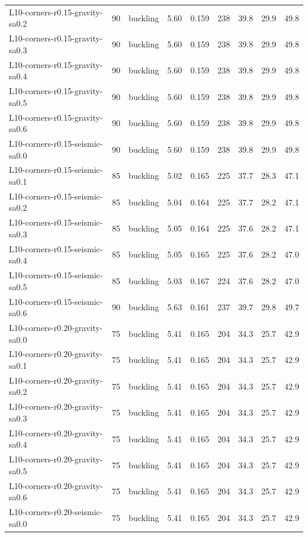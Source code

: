 \begin{longtable}{lrlrrrrrr}
L10-corners-r0.15-gravity-sa0.2 & 90 & buckling & 5.60 & 0.159 & 238 & 39.8 & 29.9 & 49.8 \\
L10-corners-r0.15-gravity-sa0.3 & 90 & buckling & 5.60 & 0.159 & 238 & 39.8 & 29.9 & 49.8 \\
L10-corners-r0.15-gravity-sa0.4 & 90 & buckling & 5.60 & 0.159 & 238 & 39.8 & 29.9 & 49.8 \\
L10-corners-r0.15-gravity-sa0.5 & 90 & buckling & 5.60 & 0.159 & 238 & 39.8 & 29.9 & 49.8 \\
L10-corners-r0.15-gravity-sa0.6 & 90 & buckling & 5.60 & 0.159 & 238 & 39.8 & 29.9 & 49.8 \\
L10-corners-r0.15-seismic-sa0.0 & 90 & buckling & 5.60 & 0.159 & 238 & 39.8 & 29.9 & 49.8 \\
L10-corners-r0.15-seismic-sa0.1 & 85 & buckling & 5.02 & 0.165 & 225 & 37.7 & 28.3 & 47.1 \\
L10-corners-r0.15-seismic-sa0.2 & 85 & buckling & 5.04 & 0.164 & 225 & 37.7 & 28.2 & 47.1 \\
L10-corners-r0.15-seismic-sa0.3 & 85 & buckling & 5.05 & 0.164 & 225 & 37.6 & 28.2 & 47.1 \\
L10-corners-r0.15-seismic-sa0.4 & 85 & buckling & 5.05 & 0.165 & 225 & 37.6 & 28.2 & 47.0 \\
L10-corners-r0.15-seismic-sa0.5 & 85 & buckling & 5.03 & 0.167 & 224 & 37.6 & 28.2 & 47.0 \\
L10-corners-r0.15-seismic-sa0.6 & 90 & buckling & 5.63 & 0.161 & 237 & 39.7 & 29.8 & 49.7 \\
L10-corners-r0.20-gravity-sa0.0 & 75 & buckling & 5.41 & 0.165 & 204 & 34.3 & 25.7 & 42.9 \\
L10-corners-r0.20-gravity-sa0.1 & 75 & buckling & 5.41 & 0.165 & 204 & 34.3 & 25.7 & 42.9 \\
L10-corners-r0.20-gravity-sa0.2 & 75 & buckling & 5.41 & 0.165 & 204 & 34.3 & 25.7 & 42.9 \\
L10-corners-r0.20-gravity-sa0.3 & 75 & buckling & 5.41 & 0.165 & 204 & 34.3 & 25.7 & 42.9 \\
L10-corners-r0.20-gravity-sa0.4 & 75 & buckling & 5.41 & 0.165 & 204 & 34.3 & 25.7 & 42.9 \\
L10-corners-r0.20-gravity-sa0.5 & 75 & buckling & 5.41 & 0.165 & 204 & 34.3 & 25.7 & 42.9 \\
L10-corners-r0.20-gravity-sa0.6 & 75 & buckling & 5.41 & 0.165 & 204 & 34.3 & 25.7 & 42.9 \\
L10-corners-r0.20-seismic-sa0.0 & 75 & buckling & 5.41 & 0.165 & 204 & 34.3 & 25.7 & 42.9 \\

\end{longtable}
